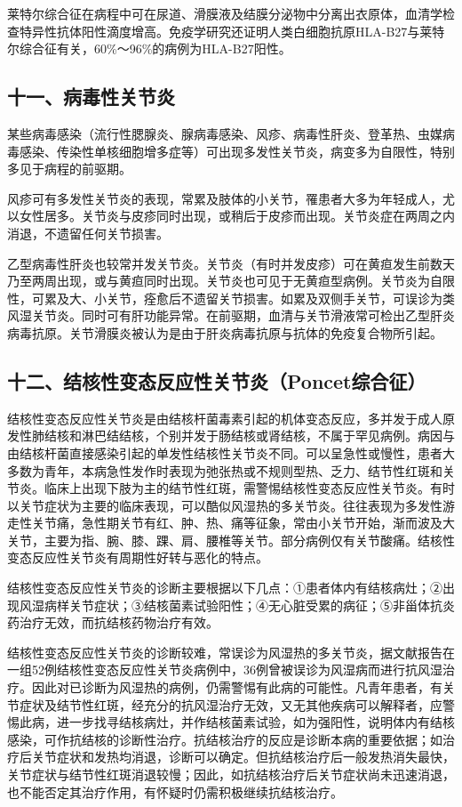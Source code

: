莱特尔综合征在病程中可在尿道、滑膜液及结膜分泌物中分离出衣原体，血清学检查特异性抗体阳性滴度增高。免疫学研究还证明人类白细胞抗原HLA-B27与莱特尔综合征有关，60\%～96\%的病例为HLA-B27阳性。

\subsection{十一、病毒性关节炎}

某些病毒感染（流行性腮腺炎、腺病毒感染、风疹、病毒性肝炎、登革热、虫媒病毒感染、传染性单核细胞增多症等）可出现多发性关节炎，病变多为自限性，特别多见于病程的前驱期。

风疹可有多发性关节炎的表现，常累及肢体的小关节，罹患者大多为年轻成人，尤以女性居多。关节炎与皮疹同时出现，或稍后于皮疹而出现。关节炎症在两周之内消退，不遗留任何关节损害。

乙型病毒性肝炎也较常并发关节炎。关节炎（有时并发皮疹）可在黄疸发生前数天乃至两周出现，或与黄疸同时出现。关节炎也可见于无黄疸型病例。关节炎为自限性，可累及大、小关节，痊愈后不遗留关节损害。如累及双侧手关节，可误诊为类风湿关节炎。同时可有肝功能异常。在前驱期，血清与关节滑液常可检出乙型肝炎病毒抗原。关节滑膜炎被认为是由于肝炎病毒抗原与抗体的免疫复合物所引起。

\subsection{十二、结核性变态反应性关节炎（Poncet综合征）}

结核性变态反应性关节炎是由结核杆菌毒素引起的机体变态反应，多并发于成人原发性肺结核和淋巴结结核，个别并发于肠结核或肾结核，不属于罕见病例。病因与由结核杆菌直接感染引起的单发性结核性关节炎不同。可以呈急性或慢性，患者大多数为青年，本病急性发作时表现为弛张热或不规则型热、乏力、结节性红斑和关节炎。临床上出现下肢为主的结节性红斑，需警惕结核性变态反应性关节炎。有时以关节症状为主要的临床表现，可以酷似风湿热的多关节炎。往往表现为多发性游走性关节痛，急性期关节有红、肿、热、痛等征象，常由小关节开始，渐而波及大关节，主要为指、腕、膝、踝、肩、腰椎等关节。部分病例仅有关节酸痛。结核性变态反应性关节炎有周期性好转与恶化的特点。

结核性变态反应性关节炎的诊断主要根据以下几点：①患者体内有结核病灶；②出现风湿病样关节症状；③结核菌素试验阳性；④无心脏受累的病征；⑤非甾体抗炎药治疗无效，而抗结核药物治疗有效。

结核性变态反应性关节炎的诊断较难，常误诊为风湿热的多关节炎，据文献报告在一组52例结核性变态反应性关节炎病例中，36例曾被误诊为风湿病而进行抗风湿治疗。因此对已诊断为风湿热的病例，仍需警惕有此病的可能性。凡青年患者，有关节症状及结节性红斑，经充分的抗风湿治疗无效，又无其他疾病可以解释者，应警惕此病，进一步找寻结核病灶，并作结核菌素试验，如为强阳性，说明体内有结核感染，可作抗结核的诊断性治疗。抗结核治疗的反应是诊断本病的重要依据；如治疗后关节症状和发热均消退，诊断可以确定。但抗结核治疗后一般发热消失最快，关节症状与结节性红斑消退较慢；因此，如抗结核治疗后关节症状尚未迅速消退，也不能否定其治疗作用，有怀疑时仍需积极继续抗结核治疗。

